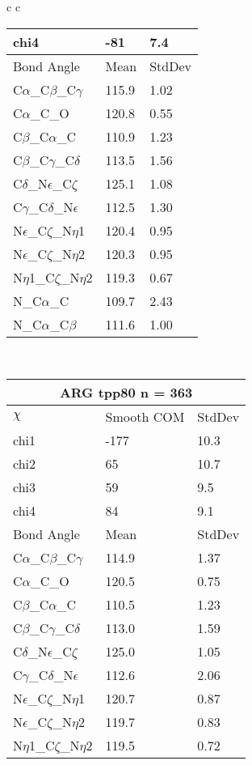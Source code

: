 \begin{longtable}{ c c }
\begin{tabular}{ l l l }
  chi4 & -81 & 7.4 \\ \midrule
  Bond Angle   & Mean     & StdDev \\ \midrule
  C$\alpha$\_C$\beta$\_C$\gamma$ & 115.9 & 1.02\\
  C$\alpha$\_C\_O & 120.8 & 0.55\\
  C$\beta$\_C$\alpha$\_C & 110.9 & 1.23\\
  C$\beta$\_C$\gamma$\_C$\delta$ & 113.5 & 1.56\\
  C$\delta$\_N$\epsilon$\_C$\zeta$ & 125.1 & 1.08\\
  C$\gamma$\_C$\delta$\_N$\epsilon$ & 112.5 & 1.30\\
  N$\epsilon$\_C$\zeta$\_N$\eta$1 & 120.4 & 0.95\\
  N$\epsilon$\_C$\zeta$\_N$\eta$2 & 120.3 & 0.95\\
  N$\eta$1\_C$\zeta$\_N$\eta$2 & 119.3 & 0.67\\
  N\_C$\alpha$\_C & 109.7 & 2.43\\
  N\_C$\alpha$\_C$\beta$ & 111.6 & 1.00\\
  \bottomrule
  \end{tabular}
  \\
  \begin{tabular}{ l l l }
  \toprule
  \multicolumn{3}{c}{ARG \textbf{tpp80} n = 363} \\ \toprule
  $\chi$       & Smooth COM & StdDev \\ \midrule
  chi1 & -177 & 10.3 \\ 
  chi2 & 65 & 10.7 \\ 
  chi3 & 59 & 9.5 \\ 
  chi4 & 84 & 9.1 \\ \midrule
  Bond Angle   & Mean     & StdDev \\ \midrule
  C$\alpha$\_C$\beta$\_C$\gamma$ & 114.9 & 1.37\\
  C$\alpha$\_C\_O & 120.5 & 0.75\\
  C$\beta$\_C$\alpha$\_C & 110.5 & 1.23\\
  C$\beta$\_C$\gamma$\_C$\delta$ & 113.0 & 1.59\\
  C$\delta$\_N$\epsilon$\_C$\zeta$ & 125.0 & 1.05\\
  C$\gamma$\_C$\delta$\_N$\epsilon$ & 112.6 & 2.06\\
  N$\epsilon$\_C$\zeta$\_N$\eta$1 & 120.7 & 0.87\\
  N$\epsilon$\_C$\zeta$\_N$\eta$2 & 119.7 & 0.83\\
  N$\eta$1\_C$\zeta$\_N$\eta$2 & 119.5 & 0.72\\

\end{tabular}
\end{longtable}
